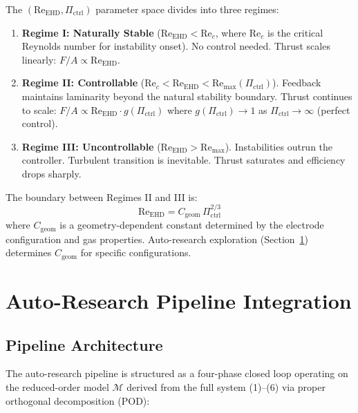 \documentclass[12pt,twocolumn]{article}
\newcommand{\Reehd}{\mathrm{Re}_{\mathrm{EHD}}}
\newcommand{\Pctrl}{\Pi_{\mathrm{ctrl}}}
\begin{document}
The $(\Reehd, \Pctrl)$ parameter space divides into three regimes:

\begin{enumerate}
  \item \textbf{Regime I: Naturally Stable}
    ($\Reehd < \mathrm{Re}_c$, where $\mathrm{Re}_c$ is the critical
    Reynolds number for instability onset).
    No control needed. Thrust scales linearly:
    $F/A \propto \Reehd$.

  \item \textbf{Regime II: Controllable}
    ($\mathrm{Re}_c < \Reehd < \mathrm{Re}_{\max}(\Pctrl)$).
    Feedback maintains laminarity beyond the natural stability
    boundary. Thrust continues to scale:
    $F/A \propto \Reehd \cdot g(\Pctrl)$ where
    $g(\Pctrl) \to 1$ as $\Pctrl \to \infty$
    (perfect control).

  \item \textbf{Regime III: Uncontrollable}
    ($\Reehd > \mathrm{Re}_{\max}$).
    Instabilities outrun the controller. Turbulent transition
    is inevitable. Thrust saturates and efficiency drops sharply.
\end{enumerate}

The boundary between Regimes II and III is:
\begin{equation}
  \Reehd = C_{\mathrm{geom}}\,\Pctrl^{2/3}
  \label{eq:regime_boundary}
\end{equation}
where $C_{\mathrm{geom}}$ is a geometry-dependent constant determined
by the electrode configuration and gas properties. Auto-research
exploration (Section~\ref{sec:autoresearch}) determines
$C_{\mathrm{geom}}$ for specific configurations.

\section{Auto-Research Pipeline Integration}
\label{sec:autoresearch}

\subsection{Pipeline Architecture}
\label{sec:autoresearch:pipeline}

The auto-research pipeline \cite{Karpathy2025} is structured as a
four-phase closed loop operating on the reduced-order model
$\mathcal{M}$ derived from the full system (1)--(6) via proper
orthogonal decomposition (POD):
\end{document}
